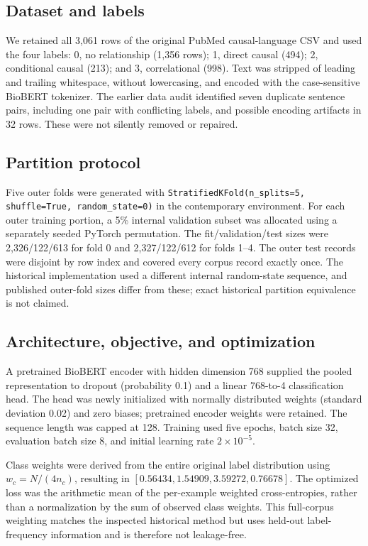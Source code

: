 \documentclass[conference]{IEEEtran}
\begin{document}
\subsection{Dataset and labels}
We retained all 3,061 rows of the original PubMed causal-language CSV and used the four labels: 0, no relationship (1,356 rows); 1, direct causal (494); 2, conditional causal (213); and 3, correlational (998). Text was stripped of leading and trailing whitespace, without lowercasing, and encoded with the case-sensitive BioBERT tokenizer. The earlier data audit identified seven duplicate sentence pairs, including one pair with conflicting labels, and possible encoding artifacts in 32 rows. These were not silently removed or repaired.

\subsection{Partition protocol}
Five outer folds were generated with \texttt{StratifiedKFold(n\_splits=5, shuffle=True, random\_state=0)} in the contemporary environment. For each outer training portion, a 5\% internal validation subset was allocated using a separately seeded PyTorch permutation. The fit/validation/test sizes were 2,326/122/613 for fold 0 and 2,327/122/612 for folds 1--4. The outer test records were disjoint by row index and covered every corpus record exactly once. The historical implementation used a different internal random-state sequence, and published outer-fold sizes differ from these; exact historical partition equivalence is not claimed.

\subsection{Architecture, objective, and optimization}
A pretrained BioBERT encoder with hidden dimension 768 supplied the pooled representation to dropout (probability 0.1) and a linear 768-to-4 classification head. The head was newly initialized with normally distributed weights (standard deviation 0.02) and zero biases; pretrained encoder weights were retained. The sequence length was capped at 128. Training used five epochs, batch size 32, evaluation batch size 8, and initial learning rate $2\times 10^{-5}$.

Class weights were derived from the entire original label distribution using $w_c=N/(4n_c)$, resulting in $[0.56434,1.54909,3.59272,0.76678]$. The optimized loss was the arithmetic mean of the per-example weighted cross-entropies, rather than a normalization by the sum of observed class weights. This full-corpus weighting matches the inspected historical method but uses held-out label-frequency information and is therefore not leakage-free.
\end{document}
